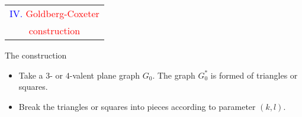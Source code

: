 \documentclass[%
pdf,
colorBG,
slideColor,
]{prosper}
\begin{document}

%






\begin{slide}{}
\begin{center}
{\Huge 
\begin{tabular*}{8cm}{c}
\\[-0.5cm]
\textcolor{blue}{IV. }\textcolor{red}{Goldberg-Coxeter}\\
\textcolor{red}{construction}
\end{tabular*}
}
\end{center}
\end{slide}

\begin{slide}{The construction}
\begin{itemize}
\item Take a $3$- or $4$-valent plane graph $G_0$. The graph $G_0^{*}$ is formed of triangles or squares.
\item Break the triangles or squares into pieces according to parameter $(k,l)$.
\end{itemize}
\begin{center}
\end{center}

\end{slide}
\end{document}
